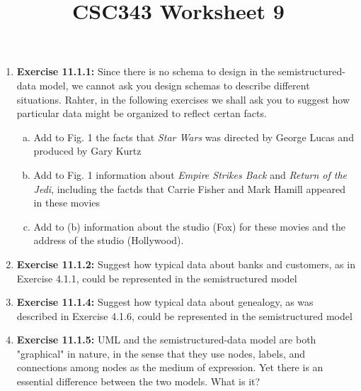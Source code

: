 \documentclass[12pt]{article}
\begin{document}
\title{CSC343 Worksheet 9}
\maketitle

\bigskip

\begin{enumerate}[1.]
    \item \textbf{Exercise 11.1.1:} Since there is no schema to design in the semistructured-data model,
    we cannot ask you design schemas to describe different situations. Rahter,
    in the following exercises we shall ask you to suggest how particular data
    might be organized to reflect certan facts.

    \bigskip

    \begin{enumerate}[a)]
        \item Add to Fig. 1 the facts that \textit{Star Wars} was directed by
        George Lucas and produced by Gary Kurtz
        \item Add to Fig. 1 information about \textit{Empire Strikes Back} and
        \textit{Return of the Jedi}, including the factds that Carrie Fisher and
        Mark Hamill appeared in these movies
        \item Add to (b) information about the studio (Fox) for these movies and
        the address of the studio (Hollywood).
    \end{enumerate}

    \item \textbf{Exercise 11.1.2:} Suggest how typical data about banks and customers,
    as in Exercise 4.1.1, could be represented in the semistructured model

    \item \textbf{Exercise 11.1.4:} Suggest how typical data about genealogy, as was
    described in Exercise 4.1.6, could be represented in the semistructured model

    \item \textbf{Exercise 11.1.5:} UML and the semistructured-data model are both "graphical"
    in nature, in the sense that they use nodes, labels, and connections among
    nodes as the medium of expression. Yet there is an essential difference between
    the two models. What is it?

\end{enumerate}
\end{document}
